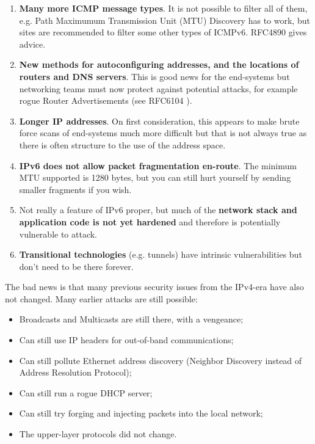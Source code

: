\begin{enumerate}

\item {\bf Many more ICMP message types}. It is not possible to filter all of them, e.g. Path Maximumum Transmission Unit (MTU) Discovery has to work, but sites are recommended to filter some other types of ICMPv6. RFC4890 \cite{rfc} gives advice.

\item {\bf New methods for autoconfiguring addresses, and the locations of routers and DNS servers}. This is good news for the end-systems but networking teams must now protect against potential attacks, for example rogue Router Advertisements (see RFC6104 \cite{rfc}).

\item {\bf Longer IP addresses}. On first consideration, this appears to make brute force scans of end-systems much more difficult but that is not always true as there is often structure to the use of the address space. 

\item {\bf IPv6 does not allow packet fragmentation en-route}. The minimum MTU supported is 1280 bytes, but you can still hurt yourself by sending smaller fragments if you wish. 

\item Not really a feature of IPv6 proper, but much of the {\bf network stack and application code is not yet hardened} and therefore is potentially vulnerable to attack.

\item {\bf Transitional technologies} (e.g. tunnels) have intrinsic vulnerabilities but don't need to be there forever.

\end{enumerate}

The bad news is that many previous security issues from the IPv4-era have also not changed. 
Many earlier attacks are still possible:

\begin {itemize}
\item Broadcasts and Multicasts are still there, with a vengeance;
\item Can still use IP headers for out-of-band communications;
\item Can still pollute Ethernet address discovery (Neighbor Discovery instead of Address Resolution Protocol);
\item Can still run a rogue DHCP server;
\item Can still try forging and injecting packets into the local network;
\item The upper-layer protocols did not change.
\end {itemize}





